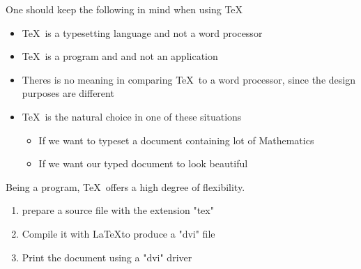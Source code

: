 \documentclass{article}
\begin{document}
One should keep the following in mind when using \TeX
\begin{itemize}
\item \TeX\ is a typesetting language and not a word processor
\item \TeX\ is a program and and not an application
\item Theres is no meaning in comparing \TeX\ to a word processor, since the design
purposes are different
\item \TeX\ is the natural choice in one of these situations
\begin{itemize}
\item If we want to typeset a document containing lot of Mathematics
\item If we want our typed document to look beautiful
\end{itemize}
\end{itemize}
Being a program, \TeX\ offers a high degree of flexibility.



\begin{enumerate}
\item prepare a source file with the extension "tex"
\item Compile it with \LaTeX to produce a "dvi" file
\item Print the document using a "dvi" driver
\end{enumerate}
\end{document}
